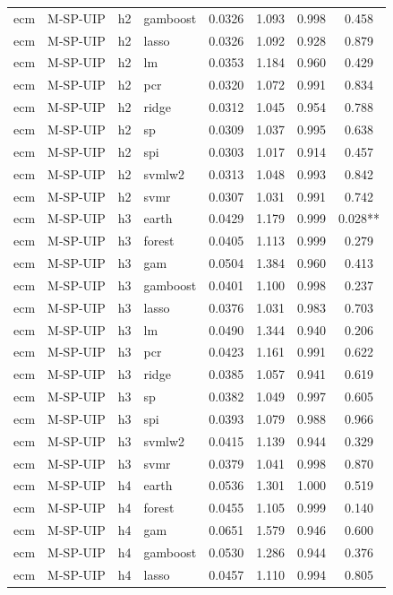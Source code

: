 \begin{ThreePartTable}
\begin{longtable}[t]{llclcccc}
ecm & M-SP-UIP & h2 & gamboost & 0.0326 & 1.093 & 0.998 & 0.458\\
ecm & M-SP-UIP & h2 & lasso & 0.0326 & 1.092 & 0.928 & 0.879\\
ecm & M-SP-UIP & h2 & lm & 0.0353 & 1.184 & 0.960 & 0.429\\
ecm & M-SP-UIP & h2 & pcr & 0.0320 & 1.072 & 0.991 & 0.834\\
ecm & M-SP-UIP & h2 & ridge & 0.0312 & 1.045 & 0.954 & 0.788\\
ecm & M-SP-UIP & h2 & sp & 0.0309 & 1.037 & 0.995 & 0.638\\
ecm & M-SP-UIP & h2 & spi & 0.0303 & 1.017 & 0.914 & 0.457\\
ecm & M-SP-UIP & h2 & svmlw2 & 0.0313 & 1.048 & 0.993 & 0.842\\
ecm & M-SP-UIP & h2 & svmr & 0.0307 & 1.031 & 0.991 & 0.742\\
\addlinespace
ecm & M-SP-UIP & h3 & earth & 0.0429 & 1.179 & 0.999 & 0.028**\\
ecm & M-SP-UIP & h3 & forest & 0.0405 & 1.113 & 0.999 & 0.279\\
ecm & M-SP-UIP & h3 & gam & 0.0504 & 1.384 & 0.960 & 0.413\\
ecm & M-SP-UIP & h3 & gamboost & 0.0401 & 1.100 & 0.998 & 0.237\\
ecm & M-SP-UIP & h3 & lasso & 0.0376 & 1.031 & 0.983 & 0.703\\
ecm & M-SP-UIP & h3 & lm & 0.0490 & 1.344 & 0.940 & 0.206\\
ecm & M-SP-UIP & h3 & pcr & 0.0423 & 1.161 & 0.991 & 0.622\\
ecm & M-SP-UIP & h3 & ridge & 0.0385 & 1.057 & 0.941 & 0.619\\
ecm & M-SP-UIP & h3 & sp & 0.0382 & 1.049 & 0.997 & 0.605\\
ecm & M-SP-UIP & h3 & spi & 0.0393 & 1.079 & 0.988 & 0.966\\
ecm & M-SP-UIP & h3 & svmlw2 & 0.0415 & 1.139 & 0.944 & 0.329\\
ecm & M-SP-UIP & h3 & svmr & 0.0379 & 1.041 & 0.998 & 0.870\\
\addlinespace
ecm & M-SP-UIP & h4 & earth & 0.0536 & 1.301 & 1.000 & 0.519\\
ecm & M-SP-UIP & h4 & forest & 0.0455 & 1.105 & 0.999 & 0.140\\
ecm & M-SP-UIP & h4 & gam & 0.0651 & 1.579 & 0.946 & 0.600\\
ecm & M-SP-UIP & h4 & gamboost & 0.0530 & 1.286 & 0.944 & 0.376\\
ecm & M-SP-UIP & h4 & lasso & 0.0457 & 1.110 & 0.994 & 0.805\\

\end{longtable}
\end{ThreePartTable}
